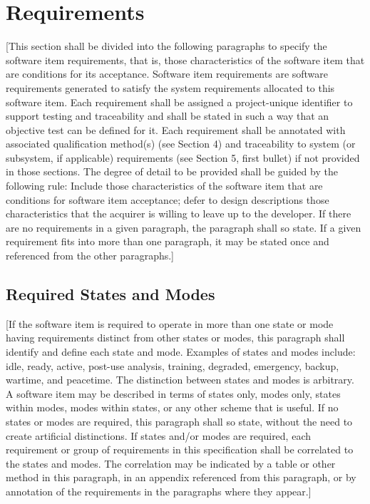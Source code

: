 \chapter{Requirements\label{ref-005}}

[This section shall be divided into the following paragraphs to specify the software item requirements, that is, those characteristics of the software item that are conditions for its acceptance. Software item requirements are software requirements generated to satisfy the system requirements allocated to this software item. Each requirement shall be assigned a project-unique identifier to support testing and traceability and shall be stated in such a way that an objective test can be defined for it. Each requirement shall be annotated with associated qualification method(s) (see Section 4) and traceability to system (or subsystem, if applicable) requirements (see Section 5, first bullet) if not provided in those sections. The degree of detail to be provided shall be guided by the following rule: Include those characteristics of the software item that are conditions for software item acceptance; defer to design descriptions those characteristics that the acquirer is willing to leave up to the developer. If there are no requirements in a given paragraph, the paragraph shall so state. If a given requirement fits into more than one paragraph, it may be stated once and referenced from the other paragraphs.]

\section{Required States and Modes\label{ref-006}}

[If the software item is required to operate in more than one state or mode having requirements distinct from other states or modes, this paragraph shall identify and define each state and mode. Examples of states and modes include: idle, ready, active, post-use analysis, training, degraded, emergency, backup, wartime, and peacetime. The distinction between states and modes is arbitrary. A software item may be described in terms of states only, modes only, states within modes, modes within states, or any other scheme that is useful. If no states or modes are required, this paragraph shall so state, without the need to create artificial distinctions. If states and/or modes are required, each requirement or group of requirements in this specification shall be correlated to the states and modes. The correlation may be indicated by a table or other method in this paragraph, in an appendix referenced from this paragraph, or by annotation of the requirements in the paragraphs where they appear.]

